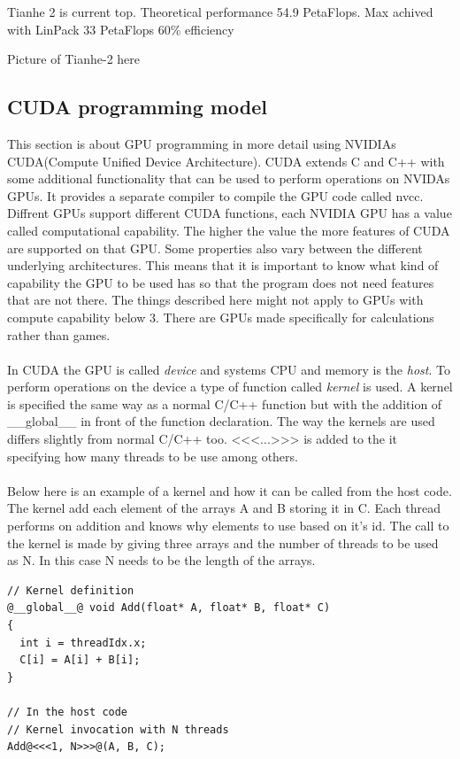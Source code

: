 \documentclass[10pt,a4paper]{report}
\begin{document}
Tianhe 2 is current top. Theoretical performance 54.9 PetaFlops.\cite{TOP500}
Max achived with LinPack 33 PetaFlops
60\% efficiency

Picture of Tianhe-2 here

\subsection{CUDA programming model}
This section is about GPU programming in more detail using NVIDIAs CUDA(Compute Unified Device Architecture)\cite{cuda}. CUDA extends C and C++ with some additional functionality that can be used to perform operations on NVIDAs GPUs. It provides a separate compiler to compile the GPU code called nvcc. Diffrent GPUs support different CUDA functions, each NVIDIA GPU has a value called computational capability. The higher the value the more features of CUDA are supported on that GPU. Some properties also vary between the different underlying architectures. This means that it is important to know what kind of capability the GPU to be used has so that the program does not need features that are not there. The things described here might not apply to GPUs with compute capability below 3. There are GPUs made specifically for calculations rather than games.\cite{cuda}\\
\\
In CUDA the GPU is called \emph{device} and systems CPU and memory is the \emph{host}. To perform operations on the device a type of function called \emph{kernel} is used. A kernel is specified the same way as a normal C/C++ function but with the addition of \_\_global\_\_ in front of the function declaration. The way the kernels are used differs slightly from normal C/C++ too. <<<...>>> is added to the it specifying how many threads to be use among others.\cite{cuda}\\
\\
Below here is an example of a kernel and how it can be called from the host code. The kernel add each element of the arrays A and B storing it in C. Each thread performs on addition and knows why elements to use based on it's id. The call to the kernel is made by giving three arrays and the number of threads to be used as N. In this case N needs to be the length of the arrays.
\begin{lstlisting}
// Kernel definition
@__global__@ void Add(float* A, float* B, float* C)
{
  int i = threadIdx.x;
  C[i] = A[i] + B[i];
}

// In the host code
// Kernel invocation with N threads
Add@<<<1, N>>>@(A, B, C);
\end{lstlisting}
\end{document}
